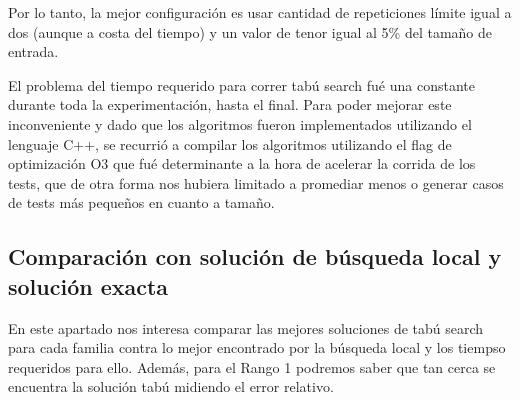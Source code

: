 \begin{figure}[h] 
 \centering
       \label{fig:randomDist1}
    \label{fig:randomMejora1}
\end{figure}

Por lo tanto, la mejor configuración es usar cantidad de repeticiones límite igual a dos (aunque a costa del tiempo) y un valor de tenor igual al 5\% del tamaño de entrada.

El problema del tiempo requerido para correr tabú search fué una constante durante toda la experimentación, hasta el final. Para poder mejorar este inconveniente y dado que los algoritmos fueron implementados utilizando el lenguaje C++, se recurrió a compilar los algoritmos utilizando el flag de optimización O3 que fué determinante a la hora de acelerar la corrida de los tests, que de otra forma nos hubiera limitado a promediar menos o generar casos de tests más pequeños en cuanto a tamaño.\\

\subsection*{Comparación con solución de búsqueda local y solución exacta}

En este apartado nos interesa comparar las mejores soluciones de tabú search para cada familia contra lo mejor encontrado por la búsqueda local y los tiempso requeridos para ello. Además, para el Rango 1 podremos saber que tan cerca se encuentra la solución tabú midiendo el error relativo.\\

